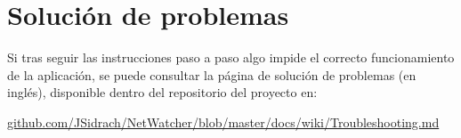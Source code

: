 \section{Solución de problemas\label{extra:manual:solucion}}

Si tras seguir las instrucciones paso a paso algo impide el correcto funcionamiento de la aplicación, se puede consultar la página de solución de problemas (en inglés), disponible dentro del repositorio del proyecto en:

\href{https://github.com/JSidrach/NetWatcher/blob/master/docs/wiki/Troubleshooting.md}{github.com/JSidrach/NetWatcher/blob/master/docs/wiki/Troubleshooting.md}